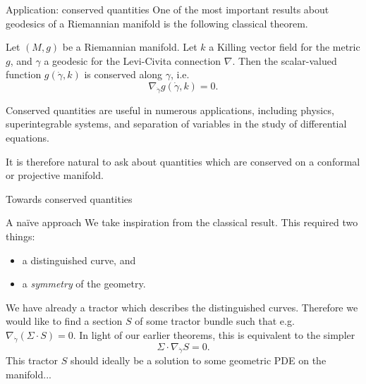 \documentclass{beamer}
\begin{document}
\begin{frame}{Application: conserved quantities}
  One of the most important results about geodesics of a Riemannian manifold is
  the following classical theorem.
  \pause
  \begin{Theorem}
    Let \( (M,g) \) be a Riemannian manifold.
    Let \( k \) a Killing vector field for the metric \( g \), and \( \gamma \)
    a geodesic for the Levi-Civita connection \( \nabla \).
    Then the scalar-valued function \( g(\dot{\gamma},k) \) is conserved along
    \( \gamma \), i.e.
    \[
      \nabla_{\dot{\gamma}} g(\dot{\gamma}, k) = 0.
    \]
  \end{Theorem}
  \pause
  Conserved quantities are useful in numerous applications, including
  physics, superintegrable systems, and separation of variables in the study of
  differential equations.

  It is therefore natural to ask about quantities which are conserved on a conformal or projective manifold. 
\end{frame}

\begin{frame}{Towards conserved quantities}
  \begin{block}{A na\"{i}ve approach}
    We take inspiration from the classical result. 
      This required two things:
      \begin{itemize}
        \pause
        \item a distinguished curve, and
        \pause
        \item a \emph{symmetry} of the geometry.
      \end{itemize}
      \pause
      We have already a tractor which describes the distinguished curves. Therefore we would like to find a section \( S \) of some tractor bundle such that e.g. \( \nabla_{\dot{\gamma}} \left(\Sigma \cdot S \right) = 0 \). 
      In light of our earlier theorems, this is equivalent to the simpler
      \[
        \Sigma \cdot \nabla_{\dot{\gamma}} S = 0.
      \]
      This tractor \( S \) should ideally be a solution to some geometric PDE on the manifold...
  \end{block}
\end{frame}
\end{document}
